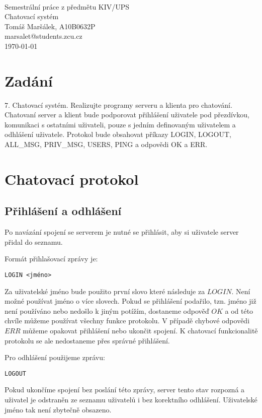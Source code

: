 \documentclass[12pt,titlepage]{article}
\begin{document}
\begin{titlepage}
\begin{center}
	\mbox{} \\[3cm]
	\Huge{Semestrální práce z předmětu KIV/UPS} \\[.5cm]
	\huge{Chatovací systém} \\[2.5cm]
	\Large{Tomáš Maršálek, A10B0632P} \\
	\large{marsalet@students.zcu.cz} \\[1cm]
	\normalsize{\today}
\end{center}
\thispagestyle{empty}
\end{titlepage}

\section{Zadání}
7. Chatovací systém. Realizujte programy serveru a klienta pro chatování.
Chatovaní server a klient bude podporovat přihlášení uživatele pod přezdívkou,
komunikaci s ostatními uživateli, pouze s jedním definovaným uživatelem a
odhlášení uživatele.  Protokol bude obsahovat příkazy LOGIN, LOGOUT, ALL\_MSG,
PRIV\_MSG, USERS, PING a odpovědi OK a ERR.

\section{Chatovací protokol}
\subsection{Přihlášení a odhlášení}
Po navázání spojení se serverem je nutné se přihlásit, aby si uživatele server přidal do seznamu.

Formát přihlašovací zprávy je:
\begin{verbatim}
LOGIN <jméno>
\end{verbatim}

Za uživatelské jméno bude použito první slovo které následuje za $LOGIN$. Není
možné používat jméno o více slovech. Pokud se přihlášení podařilo, tzn. jméno
již není používáno nebo nedošlo k jiným potížím, dostaneme odpověď $OK$ a od
této chvíle můžeme používat všechny funkce protokolu. V případě chybové
odpovědi $ERR$ můžeme opakovat přihlášení nebo ukončit spojení. K chatovací
funkcionalitě protokolu se ale nedostaneme přes správné přihlášení.

Pro odhlášení použijeme zprávu:
\begin{verbatim}
LOGOUT
\end{verbatim}
Pokud ukončíme spojení bez poslání této zprávy, server tento stav rozpozná a
uživatel je odstraněn ze seznamu uživatelů i bez korektního odhlášení.
Uživatelské jméno tak není zbytečně obsazeno.
\end{document}
